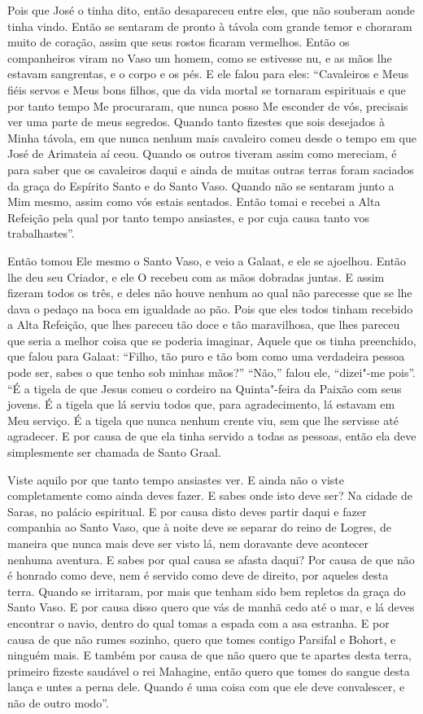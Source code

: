 Pois que José o tinha dito, então desapareceu entre eles, que não souberam aonde
tinha vindo. Então se sentaram de pronto à távola com grande temor e choraram
muito de coração, assim que seus rostos ficaram vermelhos. Então os
companheiros viram no Vaso um homem, como se estivesse nu, e as mãos lhe
estavam sangrentas, e o corpo e os pés. E ele falou para eles: “Cavaleiros e
Meus fiéis servos e Meus bons filhos, que da vida mortal se tornaram
espirituais e que por tanto tempo Me procuraram, que nunca posso Me esconder de
vós, precisais ver uma parte de meus segredos. Quando tanto fizestes que sois
desejados à Minha távola, em que nunca nenhum mais cavaleiro comeu desde o
tempo em que José de Arimateia aí ceou. Quando os outros tiveram assim como
mereciam, é para saber que os cavaleiros daqui e ainda de muitas outras terras
foram saciados da graça do Espírito Santo e do Santo Vaso. Quando não se
sentaram junto a Mim mesmo, assim como vós estais sentados. Então tomai e
recebei a Alta Refeição pela qual por tanto tempo ansiastes, e por cuja causa
tanto vos trabalhastes”.

Então tomou Ele mesmo o Santo Vaso, e veio a Galaat, e ele se ajoelhou. Então
lhe deu seu Criador, e ele O recebeu com as mãos dobradas juntas. E assim
fizeram todos os três, e deles não houve nenhum ao qual não parecesse que se
lhe dava o pedaço na boca em igualdade ao pão. Pois que eles todos tinham
recebido a Alta Refeição, que lhes pareceu tão doce e tão maravilhosa, que lhes
pareceu que seria a melhor coisa que se poderia imaginar, Aquele que os tinha
preenchido, que falou para Galaat: “Filho, tão puro e tão bom como uma
verdadeira pessoa pode ser, sabes o que tenho sob minhas mãos?” “Não,” falou
ele, “dizei"-me pois”. “É a tigela de que Jesus comeu o cordeiro na Quinta"-feira
da Paixão com seus jovens. É a tigela que lá serviu todos que, para
agradecimento, lá estavam em Meu serviço. É a tigela que nunca nenhum crente
viu, sem que lhe servisse até agradecer. E por causa de que ela tinha servido a
todas as pessoas, então ela deve simplesmente ser chamada de Santo Graal. 

Viste aquilo por que tanto tempo ansiastes ver. E ainda não o viste
completamente como ainda deves fazer. E sabes onde isto deve ser? Na cidade de
Saras, no palácio espiritual. E por causa disto deves partir daqui e fazer
companhia ao Santo Vaso, que à noite deve se separar do reino de Logres, de
maneira que nunca mais deve ser visto lá, nem doravante deve acontecer nenhuma
aventura. E sabes por qual causa se afasta daqui? Por causa de que não é
honrado como deve, nem é servido como deve de direito, por aqueles desta terra.
Quando se irritaram, por mais que tenham sido bem repletos da graça do Santo
Vaso. E por causa disso quero que vás de manhã cedo até o mar, e lá deves
encontrar o navio, dentro do qual tomas a espada com a asa estranha. E por
causa de que não rumes sozinho, quero que tomes contigo Parsifal e Bohort, e
ninguém mais. E também por causa de que não quero que te apartes desta terra,
primeiro fizeste saudável o rei Mahagine, então quero que tomes do sangue desta
lança e untes a perna dele. Quando é uma coisa com que ele deve convalescer, e
não de outro modo”.

